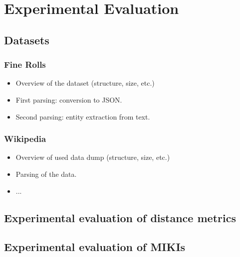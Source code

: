 \section{Experimental Evaluation}
\label{sec:experiments}




\subsection{Datasets}
\label{sec:datasets}




\subsubsection{Fine Rolls}
\label{sec:fine_rolls}

\begin{itemize}
	\item Overview of the dataset (structure, size, etc.)
	\item First parsing: conversion to JSON.
	\item Second parsing: entity extraction from text.
\end{itemize}




\subsubsection{Wikipedia}
\label{sec:wikipedia}
	
\begin{itemize}
	\item Overview of used data dump (structure, size, etc.)
	\item Parsing of the data.
	\item ...
\end{itemize}




\subsection{Experimental evaluation of distance metrics}




\subsection{Experimental evaluation of MIKIs}
\label{sec:miki_evaluation}

